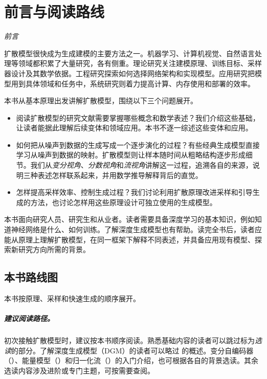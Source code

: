 \chapter*{前言与阅读路线}
{\sffamily\slshape 前言}


扩散模型很快成为生成建模的主要方法之一。机器学习、计算机视觉、自然语言处理等领域都积累了大量研究，各有侧重。理论研究关注建模原理、训练目标、采样器设计及其数学依据。工程研究探索如何选择网络架构和实现模型。应用研究把模型用到具体领域和任务中，系统研究则着力提高计算、内存使用和部署的效率。

本书从基本原理出发讲解扩散模型，围绕以下三个问题展开。
\begin{itemize}
    \item 阅读扩散模型的研究文献需要掌握哪些概念和数学表述？我们介绍这些基础，让读者能据此理解后续变体和领域应用。本书不逐一综述这些变体和应用。
    \item 如何把从噪声到数据的生成写成一个逐步演化的过程？有些经典生成模型直接学习从噪声到数据的映射。扩散模型则让样本随时间从粗略结构逐步形成细节。我们从\emph{变分视角}、\emph{分数视角}和\emph{流视角}讲解这一过程，追溯各自的来源，说明三种表述怎样联系起来，并用数学推导解释背后的直觉。
    \item 怎样提高采样效率、控制生成过程？我们讨论利用扩散原理改进采样和引导生成的方法，也讨论怎样用这些原理设计可独立使用的生成模型。
\end{itemize}


本书面向研究人员、研究生和从业者。读者需要具备深度学习的基本知识，例如知道神经网络是什么、如何训练。了解深度生成模型也有帮助。读完全书后，读者应能从原理上理解扩散模型，在同一框架下解释不同表述，并具备应用现有模型、探索新研究方向所需的背景。


\section*{\centering \Large 本书路线图}

本书按原理、采样和快速生成的顺序展开。

\paragraph{建议阅读路径。}
初次接触扩散模型时，建议按本书顺序阅读。熟悉基础内容的读者可以跳过标为\emph{选读}的部分。了解深度生成模型（DGM）的读者可以略过  的概述。变分自编码器（）、能量模型（）和归一化流（）的入门介绍，也可根据各自的背景选读。其余选读内容涉及进阶或专门主题，可按需要查阅。

